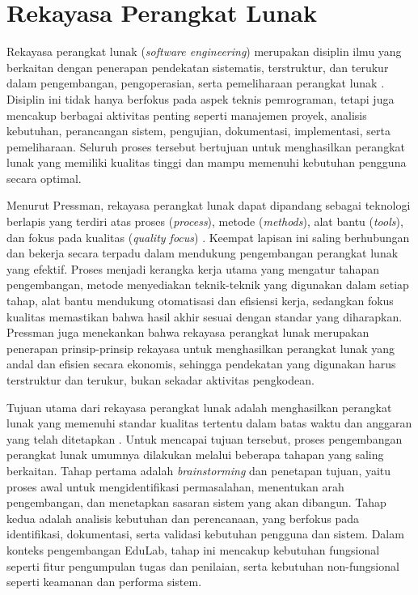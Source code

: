 \documentclass[12pt,a4paper,twoside]{report}
\begin{document}
\section{Rekayasa Perangkat Lunak}

Rekayasa perangkat lunak (\textit{software engineering}) merupakan disiplin ilmu yang berkaitan dengan penerapan pendekatan sistematis, terstruktur, dan terukur dalam pengembangan, pengoperasian, serta pemeliharaan perangkat lunak \cite{sommerville2016}. Disiplin ini tidak hanya berfokus pada aspek teknis pemrograman, tetapi juga mencakup berbagai aktivitas penting seperti manajemen proyek, analisis kebutuhan, perancangan sistem, pengujian, dokumentasi, implementasi, serta pemeliharaan. Seluruh proses tersebut bertujuan untuk menghasilkan perangkat lunak yang memiliki kualitas tinggi dan mampu memenuhi kebutuhan pengguna secara optimal.

Menurut Pressman, rekayasa perangkat lunak dapat dipandang sebagai teknologi berlapis yang terdiri atas proses (\textit{process}), metode (\textit{methods}), alat bantu (\textit{tools}), dan fokus pada kualitas (\textit{quality focus}) \cite{pressman2014}. Keempat lapisan ini saling berhubungan dan bekerja secara terpadu dalam mendukung pengembangan perangkat lunak yang efektif. Proses menjadi kerangka kerja utama yang mengatur tahapan pengembangan, metode menyediakan teknik-teknik yang digunakan dalam setiap tahap, alat bantu mendukung otomatisasi dan efisiensi kerja, sedangkan fokus kualitas memastikan bahwa hasil akhir sesuai dengan standar yang diharapkan. Pressman juga menekankan bahwa rekayasa perangkat lunak merupakan penerapan prinsip-prinsip rekayasa untuk menghasilkan perangkat lunak yang andal dan efisien secara ekonomis, sehingga pendekatan yang digunakan harus terstruktur dan terukur, bukan sekadar aktivitas pengkodean.

Tujuan utama dari rekayasa perangkat lunak adalah menghasilkan perangkat lunak yang memenuhi standar kualitas tertentu dalam batas waktu dan anggaran yang telah ditetapkan \cite{sommerville2016}. Untuk mencapai tujuan tersebut, proses pengembangan perangkat lunak umumnya dilakukan melalui beberapa tahapan yang saling berkaitan. Tahap pertama adalah \textit{brainstorming} dan penetapan tujuan, yaitu proses awal untuk mengidentifikasi permasalahan, menentukan arah pengembangan, dan menetapkan sasaran sistem yang akan dibangun. Tahap kedua adalah analisis kebutuhan dan perencanaan, yang berfokus pada identifikasi, dokumentasi, serta validasi kebutuhan pengguna dan sistem. Dalam konteks pengembangan EduLab, tahap ini mencakup kebutuhan fungsional seperti fitur pengumpulan tugas dan penilaian, serta kebutuhan non-fungsional seperti keamanan dan performa sistem.
\end{document}
